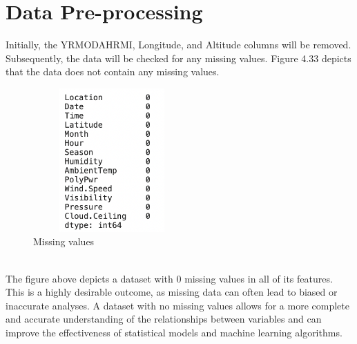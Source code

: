 \documentclass{report}
\begin{document}
\section{Data Pre-processing}
Initially, the YRMODAHRMI, Longitude, and Altitude columns will be removed. Subsequently, the data will be checked for any missing values. Figure 4.33 depicts that the data does not contain any missing values.
\begin{figure}[h!]
  \centering
    \includegraphics[width=6cm, height=5.5cm] {mv.png}
    \caption{Missing values}
    \label{fig:my_label}
\end{figure}\hfill \break
\\
The figure above depicts a dataset with 0 missing values in all of its features. This is a highly desirable outcome, as missing data can often lead to biased or inaccurate analyses. A dataset with no missing values allows for a more complete and accurate understanding of the relationships between variables and can improve the effectiveness of statistical models and machine learning algorithms. 
\end{document}
